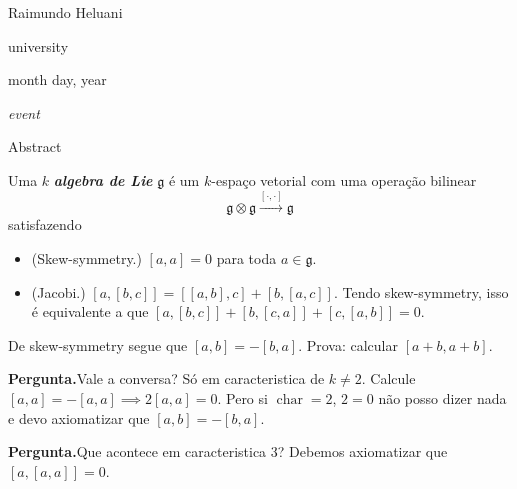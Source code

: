 \hfill{\Large Raimundo Heluani}

{\Large \hfill university}

\hfill{\large month day, year

\hfill \textit{event}}
\vspace{2em}

\begin{thing6}{Abstract}

\end{thing6}
\vspace{2em}
\begin{defn}\leavevmode
Uma \(k\) \textit{\textbf{algebra de Lie}} \( \mathfrak{g}\) é um \(k\)-espaço vetorial com uma operação bilinear
\[\mathfrak{g} \otimes \mathfrak{g} \xrightarrow{[\cdot ,\cdot ]}\mathfrak{g}\]
satisfazendo
\begin{itemize}
	\item (Skew-symmetry.) \([a,a]=0\) para toda \(a \in \mathfrak{g}\).
	\item (Jacobi.) \([a,[b,c]]=[[a,b],c]+[b,[a,c]]\). Tendo skew-symmetry, isso  é equivalente a que \([a,[b,c]]+[b,[c,a]]+[c,[a,b]]=0\).
\end{itemize}
\end{defn}

\begin{remark}\leavevmode
	De skew-symmetry segue que \([a,b]=-[b,a]\). Prova: calcular  \([a+b,a+b]\). 

	{\color{4}\bfseries Pergunta.}\hspace{.5em}Vale a conversa? Só em caracteristica de \(k \neq 2\). Calcule \([a,a]=-[a,a]\implies 2[a,a]=0\). Pero si \(\operatorname{char}=2\), \(2=0\) não posso dizer nada e devo axiomatizar que  \([a,b]=-[b,a]\). 

	{\color{4}\bfseries Pergunta.}\hspace{.5em}Que acontece em caracteristica 3? Debemos axiomatizar que \([a,[a,a]]=0\).
\end{remark}

